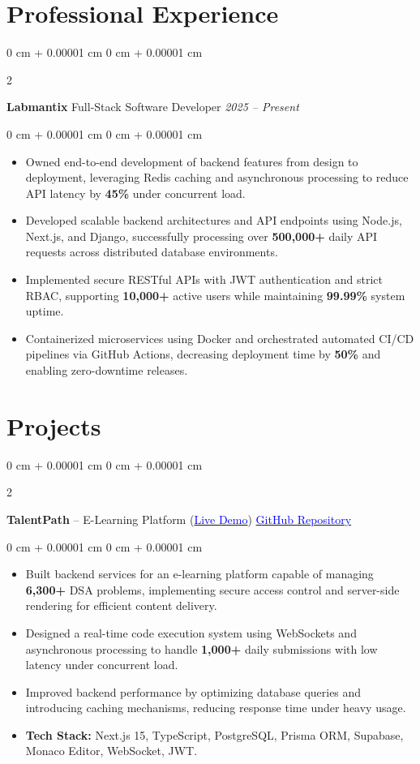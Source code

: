 \documentclass[9pt, letterpaper]{article}
\newenvironment{highlights}{
    \begin{itemize}[
        topsep=0.04 cm,
        parsep=0.04 cm,
        partopsep=0pt,
        itemsep=0pt,
        leftmargin=0.4 cm + 10pt
    ]
}{
    \end{itemize}
} %
\newenvironment{onecolentry}{
    \begin{adjustwidth}{
        0 cm + 0.00001 cm
    }{
        0 cm + 0.00001 cm
    }
}{
    \end{adjustwidth}
} %
\newenvironment{twocolentry}[2][]{%
    \onecolentry
    \def\secondColumn{#2}
    \setcolumnwidth{\fill, 4.5 cm}
    \begin{paracol}{2}
}{%
    \switchcolumn \raggedleft \secondColumn
    \end{paracol}
    \end{onecolentry}
}
\begin{document}
\section{Professional Experience}
\begin{twocolentry}{
    \textit{2025 -- Present} }
    \textbf{Labmantix} \textbar{} {Full-Stack Software Developer}
\end{twocolentry}
\begin{onecolentry}
    \begin{highlights}
        \item Owned end-to-end development of backend features from design to deployment, leveraging Redis caching and asynchronous processing to reduce API latency by \textbf{45\%} under concurrent load.
        \item Developed scalable backend architectures and API endpoints using Node.js, Next.js, and Django, successfully processing over \textbf{500,000+} daily API requests across distributed database environments.
        \item Implemented secure RESTful APIs with JWT authentication and strict RBAC, supporting \textbf{10,000+} active users while maintaining \textbf{99.99\%} system uptime.
        \item Containerized microservices using Docker and orchestrated automated CI/CD pipelines via GitHub Actions, decreasing deployment time by \textbf{50\%} and enabling zero-downtime releases.
    \end{highlights}
\end{onecolentry}

\section{Projects}

\begin{twocolentry}{\href{https://github.com/vamsi-lpu18/TalentPath}{\textcolor{blue}{GitHub Repository}}}
    \textbf{TalentPath} -- E-Learning Platform (\href{https://talentpath.vercel.app/}{\textcolor{blue}{Live Demo}})
\end{twocolentry}
\begin{onecolentry}
    \begin{highlights}
    \item Built backend services for an e-learning platform capable of managing \textbf{6,300+} DSA problems, implementing secure access control and server-side rendering for efficient content delivery.
    \item Designed a real-time code execution system using WebSockets and asynchronous processing to handle \textbf{1,000+} daily submissions with low latency under concurrent load.
    \item Improved backend performance by optimizing database queries and introducing caching mechanisms, reducing response time under heavy usage.
    \item \textbf{Tech Stack:} Next.js 15, TypeScript, PostgreSQL, Prisma ORM, Supabase, Monaco Editor, WebSocket, JWT.
    \end{highlights}
\end{onecolentry}
\end{document}

